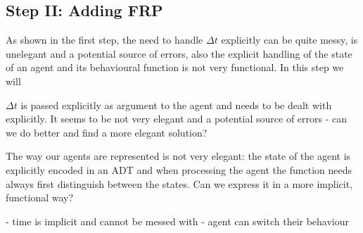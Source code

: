 \subsection{Step II: Adding FRP}
As shown in the first step, the need to handle $\Delta t$ explicitly can be quite messy, is unelegant and a potential source of errors, also the explicit handling of the state of an agent and its behavioural function is not very functional. In this step we will 

\item $\Delta t$ is passed explicitly as argument to the agent and needs to be dealt with explicitly. It seems to be not very elegant and a potential source of errors - can we do better and find a more elegant solution? 
	\item The way our agents are represented is not very elegant: the state of the agent is explicitly encoded in an ADT and when processing the agent the function needs always first distinguish between the states. Can we express it in a more implicit, functional way?
	
- time is implicit and cannot be messed with
- agent can switch their behaviour